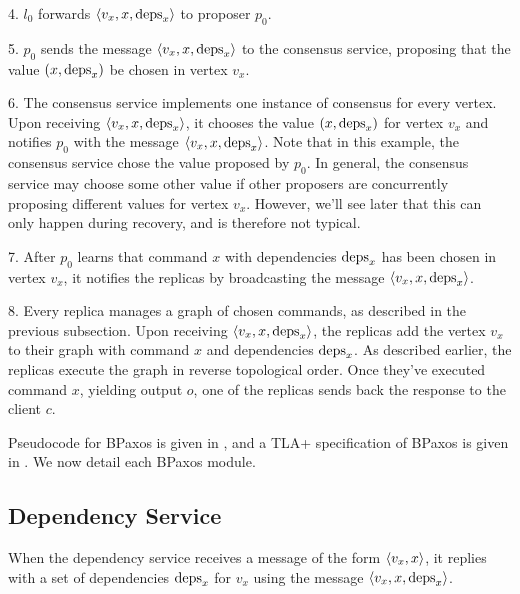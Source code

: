 4. $l_0$ forwards $\langle v_x, x, \text{deps}_x \rangle$ to proposer $p_0$.

5. $p_0$ sends the message $\langle v_x, x, \text{deps}_x \rangle$ to the consensus service,
proposing that the value $(x, \text{deps}_x)$ be chosen in vertex $v_x$.

6. The consensus service implements one instance of consensus for every vertex.
Upon receiving $\langle v_x, x, \text{deps}_x \rangle$, it chooses the value $(x, \text{deps}_x)$
for vertex $v_x$ and notifies $p_0$ with the message $\langle v_x, x, \text{deps}_x \rangle$.
Note that in this example, the consensus service chose the value proposed by
$p_0$. In general, the consensus service may choose some other value if other
proposers are concurrently proposing different values for vertex $v_x$.
However, we'll see later that this can only happen during recovery, and is
therefore not typical.

7. After $p_0$ learns that command $x$ with dependencies $\text{deps}_x$ has been
chosen in vertex $v_x$, it notifies the replicas by broadcasting the message
$\langle v_x, x, \text{deps}_x \rangle$.

8. Every replica manages a graph of chosen commands, as described in the
previous subsection. Upon receiving $\langle v_x, x, \text{deps}_x \rangle$, the replicas add
the vertex $v_x$ to their graph with command $x$ and dependencies $\text{deps}_x$.
As described earlier, the replicas execute the graph in reverse topological
order. Once they've executed command $x$, yielding output $o$, one of the
replicas sends back the response to the client $c$.

Pseudocode for BPaxos is given in , and a TLA+
specification of BPaxos is given in . We now detail each BPaxos
module.

{}
{}

\subsection{Dependency Service}
When the dependency service receives a message of the form $\langle v_x, x \rangle$, it
replies with a set of dependencies $\text{deps}_x$ for $v_x$ using the message
$\langle v_x, x, \text{deps}_x \rangle$.


